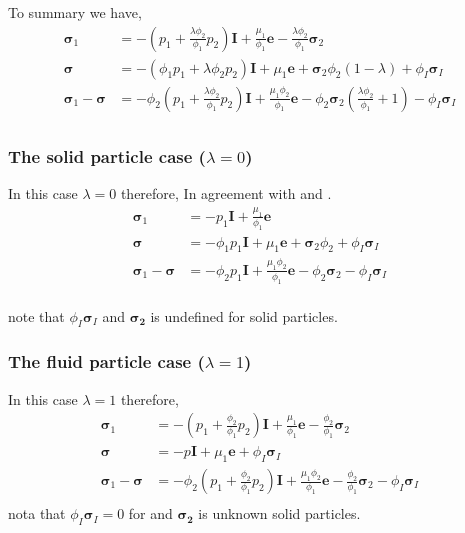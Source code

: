 To summary we have, 
\begin{align*}
    \bm{\sigma}_1 
    &= - \left(p_1 + \frac{\lambda \phi_2}{\phi_1} p_2\right) \textbf{I}
    + \frac{\mu_1}{\phi_1} \textbf{e}
    - \frac{\lambda \phi_2}{\phi_1} \bm{\sigma}_2 \\
    \bm{\sigma}
    &= - (\phi_1 p_1 + \lambda \phi_2 p_2) \textbf{I}
    + \mu_1 \textbf{e}
    + \bm{\sigma}_2 \phi_2 (1 - \lambda)
    +\phi_I \bm{\sigma}_I \\
    \bm{\sigma}_1 - \bm{\sigma}
    &=- \phi_2 \left(p_1 + \frac{\lambda \phi_2}{\phi_1} p_2\right) \textbf{I}
    + \frac{\mu_1\phi_2}{\phi_1} \textbf{e}
    - \phi_2\bm{\sigma}_2 \left(
        \frac{\lambda \phi_2}{\phi_1} + 1
    \right)
    - \phi_I \bm{\sigma}_I\\
\end{align*}

\subsubsection{The solid particle case ($\lambda = 0$)}
In this case $\lambda = 0$ therefore, 
In agreement with \citet{jackson1997locally} and \citet{zhang1997momentum}. 
\begin{align*}
    \bm{\sigma}_1 
    &= - p_1  \textbf{I}
    + \frac{\mu_1}{\phi_1} \textbf{e}\\
    \bm{\sigma}
    &= - \phi_1 p_1 \textbf{I}
    + \mu_1 \textbf{e}
    + \bm{\sigma}_2 \phi_2 
    +\phi_I \bm{\sigma}_I \\
    \bm{\sigma}_1 - \bm{\sigma}
    &=- \phi_2 p_1  \textbf{I}
    + \frac{\mu_1\phi_2}{\phi_1} \textbf{e}
    - \phi_2\bm{\sigma}_2 
    - \phi_I \bm{\sigma}_I\\
\end{align*}

note that $\phi_I \bm{\sigma}_I$ and $\bm{\sigma_2}$ is undefined for solid particles. 

\subsubsection{The fluid particle case ($\lambda = 1$)}
In this case $\lambda = 1$ therefore, 
\begin{align*}
    \bm{\sigma}_1 
    &= - \left(p_1 + \frac{\phi_2}{\phi_1} p_2\right) \textbf{I}
    + \frac{\mu_1}{\phi_1} \textbf{e}
    - \frac{\phi_2}{\phi_1} \bm{\sigma}_2 \\
    \bm{\sigma}
    &= - p \textbf{I}
    + \mu_1 \textbf{e}
    +\phi_I \bm{\sigma}_I \\
    \bm{\sigma}_1 - \bm{\sigma}
    &=- \phi_2 \left(p_1 + \frac{\phi_2}{\phi_1} p_2\right) \textbf{I}
    + \frac{\mu_1\phi_2}{\phi_1} \textbf{e}
    - \frac{\phi_2}{\phi_1}\bm{\sigma}_2 
    - \phi_I \bm{\sigma}_I\\
\end{align*}
nota that $\phi_I \bm{\sigma}_I = 0$ for and $\bm{\sigma_2}$ is unknown solid particles. 

